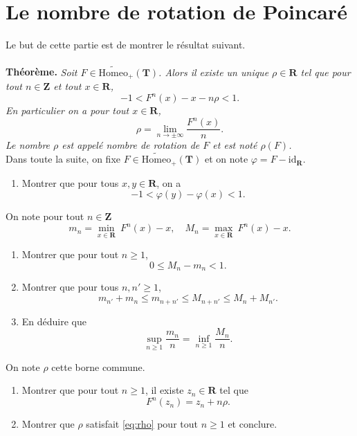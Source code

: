 \documentclass[a4paper,12pt]{article}
\theoremstyle{plain}
\theoremstyle{definition}
\newcommand{\T}{\mathbf{T}}
\newcommand{\R}{\mathbf{R}}
\newcommand{\Z}{\mathbf{Z}}
\newcommand{\Homeo}{\mathrm{Homeo}}
\begin{document}
{%
\section*{Le nombre de rotation de Poincar\'e}
Le but de cette partie est de montrer le r\'esultat suivant. \\ \\
\textbf{Th\'eor\`eme.}\textit{
Soit $F \in \widetilde{\Homeo}_+(\T)$. Alors il existe un unique $\rho \in \R$ tel que pour tout $n \in \Z$ et tout $x \in \R$,
\begin{equation}\label{eq:rho}
-1 <  F^n(x) -x - n\rho < 1.
\end{equation}
En particulier on a pour tout $x\in \R$, 
$$
\rho = \underset{n \to \pm \infty}{\lim} \frac{{F}^n(x)}{n}.
$$
Le nombre $\rho$ est appel\'e \emph{nombre de rotation} de $F$ et est not\'e $\rho(F)$.} \\

\noindent Dans toute la suite, on fixe $F \in \widetilde{\Homeo}_+(\T)$ et on note $\varphi = F - \mathrm{id}_\R$. 
\begin{enumerate}[resume, label=\textbf{\arabic*.}]
\item Montrer que pour tous $x,y \in \R$, on a
$$
-1 < \varphi(y) - \varphi(x) < 1.
$$
\end{enumerate}
On note pour tout $n \in \Z$
$$
m_n = \underset{x \in \R}{\min}\ F^n(x)-x, \quad M_n = \underset{x \in \R}{\max}\ F^n(x) - x.
$$
\begin{enumerate}[resume, label=\textbf{\arabic*.}]
\item Montrer que pour tout $n \geq 1$,
$$
0 \leq M_n - m_n < 1.
$$
\item Montrer que pour tous $n, n' \geq 1$,
$$
{m_{n'}} + m_n \leq m_{n + n'} \leq M_{n+n'} \leq {M_n} + M_{n'}.
$$
\item En d\'eduire que
$$
\sup_{n \geq 1} \frac{m_n}{n} = \inf_{n \geq 1} \frac{M_n}{n}.
$$
\end{enumerate}
On note $\rho$ cette borne commune.  \\
\begin{enumerate}[resume, label=\textbf{\arabic*.}]
\item Montrer que pour tout $n \geq 1$, il existe $z_n \in \R$ tel que
$$
F^n(z_n) = z_n + n \rho.
$$
\item Montrer que $\rho$ satisfait \eqref{eq:rho} pour tout $n \geq 1$ et conclure.
\end{enumerate}

}
\end{document}

